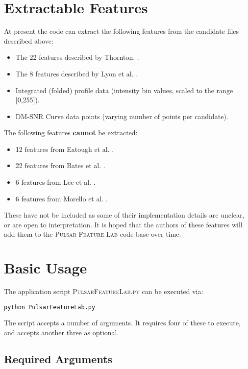 \documentclass[twoside,a4paper]{refart}
\begin{document}
\section{Extractable Features}
At present the code can extract the following features from the candidate files described above:
\begin{itemize}
\item The 22 features described by Thornton. \cite{ThorntonPhD:1}.
\item The 8 features described by Lyon et al. \cite{Lyon:2015:jk}.
\item Integrated (folded) profile data (intensity bin values, scaled to the range [0,255]).
\item DM-SNR Curve data points (varying number of points per candidate).
\end{itemize}\newpage
The following features \textbf{cannot} be extracted:
\begin{itemize}
\item 12 features from Eatough et al. \cite{Eatough:2010:uz}.
\item 22 features from Bates et al. \cite{Bates:2012:mb}.
\item 6 features from  Lee et al. \cite{Lee:2013:sk}.
\item 6 features from Morello et al. \cite{Morello:2014:eb}.
\end{itemize}
These have not be included as some of their implementation details are unclear, or are open to interpretation. It is hoped that the authors of these features will add them to the \textsc{Pulsar Feature Lab} code base over time.
\section{Basic Usage}
The application script \textsc{PulsarFeatureLab.py} can be executed via:

\begin{lstlisting}
python PulsarFeatureLab.py
\end{lstlisting}

The script accepts a number of arguments. It requires four of these to execute, and accepts another three as optional.
\subsection{Required Arguments}
                                             
\end{document}
